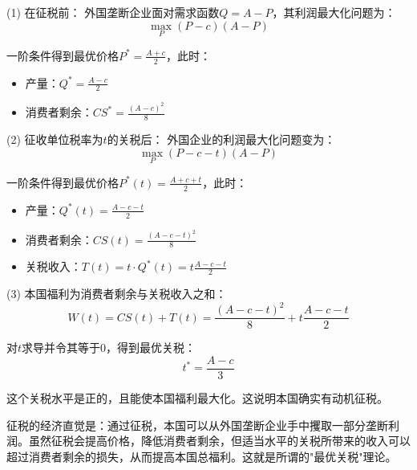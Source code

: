 \documentclass[12pt]{article}
\begin{document}
(1) 在征税前：
外国垄断企业面对需求函数$Q=A-P$，其利润最大化问题为：
\[\max_P (P-c)(A-P)\]

一阶条件得到最优价格$P^*=\frac{A+c}{2}$，此时：
\begin{itemize}
\item 产量：$Q^*=\frac{A-c}{2}$
\item 消费者剩余：$CS^*=\frac{(A-c)^2}{8}$
\end{itemize}

(2) 征收单位税率为$t$的关税后：
外国企业的利润最大化问题变为：
\[\max_P (P-c-t)(A-P)\]

一阶条件得到最优价格$P^*(t)=\frac{A+c+t}{2}$，此时：
\begin{itemize}
\item 产量：$Q^*(t)=\frac{A-c-t}{2}$
\item 消费者剩余：$CS(t)=\frac{(A-c-t)^2}{8}$
\item 关税收入：$T(t)=t\cdot Q^*(t)=t\frac{A-c-t}{2}$
\end{itemize}

(3) 本国福利为消费者剩余与关税收入之和：
\[W(t)=CS(t)+T(t)=\frac{(A-c-t)^2}{8}+t\frac{A-c-t}{2}\]

对$t$求导并令其等于0，得到最优关税：
\[t^*=\frac{A-c}{3}\]

这个关税水平是正的，且能使本国福利最大化。这说明本国确实有动机征税。

征税的经济直觉是：通过征税，本国可以从外国垄断企业手中攫取一部分垄断利润。虽然征税会提高价格，降低消费者剩余，但适当水平的关税所带来的收入可以超过消费者剩余的损失，从而提高本国总福利。这就是所谓的"最优关税"理论。
\end{document}
